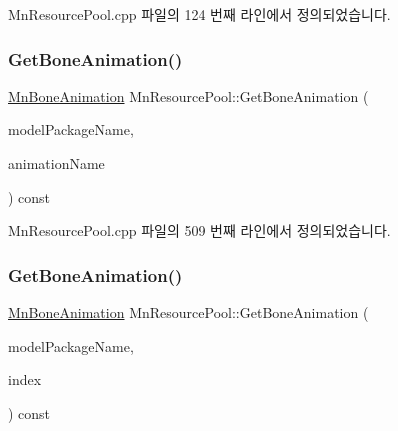 Mn\+Resource\+Pool.\+cpp 파일의 124 번째 라인에서 정의되었습니다.

\mbox{\label{class_m_n_l_1_1_mn_resource_pool_a2def364302f9dc1a8c45f6d55885eef6}} 
\subsubsection{\texorpdfstring{Get\+Bone\+Animation()}{GetBoneAnimation()}\hspace{0.1cm}{\footnotesize\ttfamily [1/2]}}
{\footnotesize\ttfamily \hyperlink{class_m_n_l_1_1_mn_bone_animation}{Mn\+Bone\+Animation} Mn\+Resource\+Pool\+::\+Get\+Bone\+Animation (\begin{DoxyParamCaption}\item[{const std\+::string \&}]{model\+Package\+Name,  }\item[{const std\+::string \&}]{animation\+Name }\end{DoxyParamCaption}) const}



Mn\+Resource\+Pool.\+cpp 파일의 509 번째 라인에서 정의되었습니다.

\mbox{\label{class_m_n_l_1_1_mn_resource_pool_a6fd196dd10a03c7cefa28500a5244999}} 
\subsubsection{\texorpdfstring{Get\+Bone\+Animation()}{GetBoneAnimation()}\hspace{0.1cm}{\footnotesize\ttfamily [2/2]}}
{\footnotesize\ttfamily \hyperlink{class_m_n_l_1_1_mn_bone_animation}{Mn\+Bone\+Animation} Mn\+Resource\+Pool\+::\+Get\+Bone\+Animation (\begin{DoxyParamCaption}\item[{const std\+::string \&}]{model\+Package\+Name,  }\item[{U\+I\+NT}]{index }\end{DoxyParamCaption}) const}



